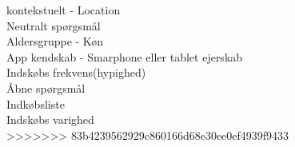 \documentclass[12pt]{article}
\begin{document}
  kontekstuelt - Location \\

  Neutralt sp\o rgsm\aa l \\

  Aldersgruppe - K\o n \\

  App kendskab - Smarphone eller tablet ejerskab \\ 

  Indsk\o bs frekvens(hypighed) \\

  \AA bne sp\o rgsm\aa l \\ 

  Indk\o bsliste \\
  
  Indsk\o bs varighed\\
 
    
>>>>>>> 83b4239562929c860166d68e30ee0ef4939f9433
\end{document}
